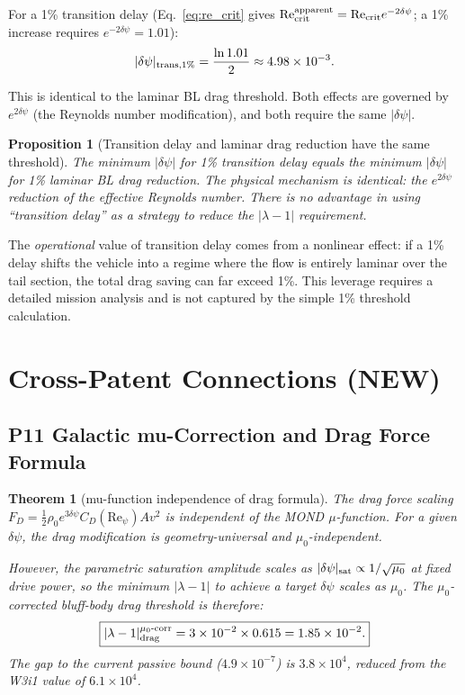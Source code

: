 \documentclass[11pt,twocolumn]{article}
\newcommand{\dpsi}{\delta\psi}
\newcommand{\lam}{\lambda}
\newcommand{\Rey}{\mathrm{Re}}
\newcommand{\half}{\tfrac{1}{2}}
\newtheorem{theorem}{Theorem}
\newtheorem{proposition}{Proposition}
\begin{document}
For a 1\% transition delay (Eq.~\eqref{eq:re_crit} gives
$\Rey_{\rm crit}^{\rm apparent} = \Rey_{\rm crit}e^{-2\dpsi}$; a 1\%
increase requires $e^{-2\dpsi} = 1.01$):
\begin{equation}
|\dpsi|_{\rm trans,1\%} = \frac{\ln 1.01}{2} \approx 4.98\times10^{-3}.
\end{equation}

This is identical to the laminar BL drag threshold. Both effects are governed
by $e^{2\dpsi}$ (the Reynolds number modification), and both require the same
$|\dpsi|$.

\begin{proposition}[Transition delay and laminar drag reduction have the same
threshold]
\label{prop:transition}
The minimum $|\dpsi|$ for 1\% transition delay equals the minimum $|\dpsi|$
for 1\% laminar BL drag reduction. The physical mechanism is identical: the
$e^{2\dpsi}$ reduction of the effective Reynolds number. There is no
advantage in using ``transition delay'' as a strategy to reduce the
$|\lam-1|$ requirement.
\end{proposition}

The \emph{operational} value of transition delay comes from a nonlinear
effect: if a 1\% delay shifts the vehicle into a regime where the flow
is entirely laminar over the tail section, the total drag saving can far
exceed 1\%. This leverage requires a detailed mission analysis and is not
captured by the simple 1\% threshold calculation.

\section{Cross-Patent Connections (NEW)}
\label{sec:cross_patent}

\subsection{P11 Galactic mu-Correction and Drag Force Formula}
\label{sec:mu_drag}

\begin{theorem}[mu-function independence of drag formula]
\label{thm:mu_drag}
The drag force scaling $F_D = \half\rho_0 e^{3\dpsi}C_D(\Rey_\psi)Av^2$
is independent of the MOND $\mu$-function. For a given $\dpsi$, the drag
modification is geometry-universal and $\mu_0$-independent.

However, the parametric saturation amplitude scales as $|\dpsi|_{\rm sat}
\propto 1/\sqrt{\mu_0}$ at fixed drive power, so the minimum $|\lam-1|$
to achieve a target $\dpsi$ scales as $\mu_0$. The $\mu_0$-corrected
bluff-body drag threshold is therefore:
\begin{equation}
\boxed{
|\lam-1|_{\rm drag}^{\mu_0\text{-corr}}
= 3\times10^{-2} \times 0.615 = 1.85\times10^{-2}.
}
\label{eq:mu_drag_corrected}
\end{equation}
The gap to the current passive bound ($4.9\times10^{-7}$) is $3.8\times10^4$,
reduced from the W3i1 value of $6.1\times10^4$.
\end{theorem}
\end{document}
